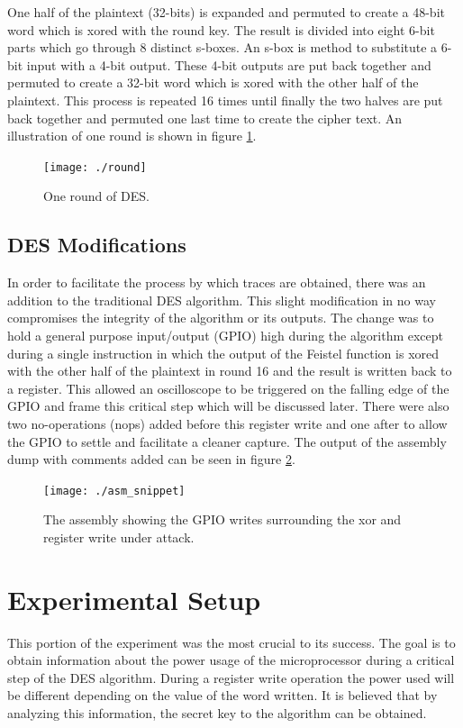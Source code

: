 	One half of the plaintext (32-bits) is expanded and permuted to create a 48-bit word which is xored with the round key.  The result is divided into eight 6-bit parts which go through 8 distinct s-boxes.  An s-box is  method to substitute a 6-bit input with a 4-bit output.  These 4-bit outputs are put back together and permuted to create a 32-bit word which is xored with the other half of the plaintext.  This process is repeated 16 times until finally the two halves are put back together and permuted one last time to create the cipher text.  An illustration of one round is shown in figure \ref{fig:round}.

	\begin{figure}[h]
	\centering
	\texttt{[image: ./round]}
	\caption{One round of DES.}
	\label{fig:round}
	\end{figure}




\subsection{DES Modifications}
	In order to facilitate the process by which traces are obtained, there was an addition to the traditional DES algorithm.  This slight modification in no way compromises the integrity of the algorithm or its outputs.  The change was to hold a general purpose input/output (GPIO) high during the algorithm except during a single instruction in which the output of the Feistel function is xored with the other half of the plaintext in round 16 and the result is written back to a register.  This allowed an oscilloscope to be triggered on the falling edge of the GPIO and frame this critical step which will be discussed later.  There were also two no-operations (nops) added before this register write and one after to allow the GPIO to settle and facilitate a cleaner capture.  The output of the assembly dump with comments added can be seen in figure \ref{fig:asm_snippet}.
	
	\begin{figure}[h]
	\centering
	\texttt{[image: ./asm\_snippet]}
	\caption{The assembly showing the GPIO writes surrounding the xor and register write under attack.}
	\label{fig:asm_snippet}
	\end{figure}

	

\section{Experimental Setup} \label{sec::expr}
	This portion of the experiment was the most crucial to its success.  The goal is to obtain information about the power usage of the microprocessor during a critical step of the DES algorithm.  During a register write operation the power used will be different depending on the value of the word written.  It is believed that by analyzing this information, the secret key to the algorithm can be obtained.
	
